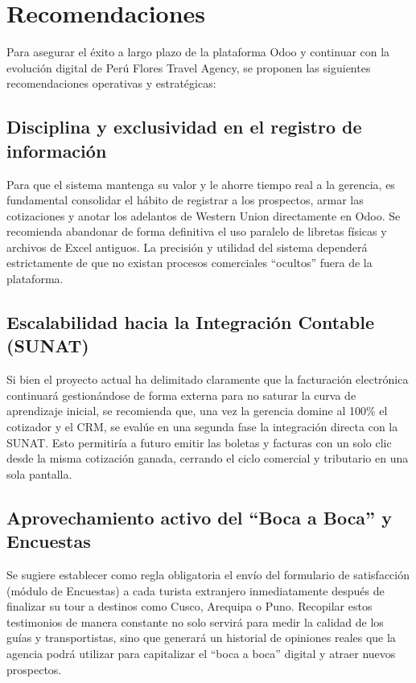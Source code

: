 \section{Recomendaciones}
\begin{indentedsubsection}
Para asegurar el éxito a largo plazo de la plataforma Odoo y continuar con la evolución digital de Perú Flores Travel Agency, se proponen las siguientes recomendaciones operativas y estratégicas:
\end{indentedsubsection}

\subsection{Disciplina y exclusividad en el registro de información}
\begin{indentedsubsection}
Para que el sistema mantenga su valor y le ahorre tiempo real a la gerencia, es fundamental consolidar el hábito de registrar a los prospectos, armar las cotizaciones y anotar los adelantos de Western Union directamente en Odoo. Se recomienda abandonar de forma definitiva el uso paralelo de libretas físicas y archivos de Excel antiguos. La precisión y utilidad del sistema dependerá estrictamente de que no existan procesos comerciales ``ocultos'' fuera de la plataforma.
\end{indentedsubsection}

\subsection{Escalabilidad hacia la Integración Contable (SUNAT)}
\begin{indentedsubsection}
Si bien el proyecto actual ha delimitado claramente que la facturación electrónica continuará gestionándose de forma externa para no saturar la curva de aprendizaje inicial, se recomienda que, una vez la gerencia domine al 100\% el cotizador y el CRM, se evalúe en una segunda fase la integración directa con la SUNAT. Esto permitiría a futuro emitir las boletas y facturas con un solo clic desde la misma cotización ganada, cerrando el ciclo comercial y tributario en una sola pantalla.
\end{indentedsubsection}

\subsection{Aprovechamiento activo del ``Boca a Boca'' y Encuestas}
\begin{indentedsubsection}
Se sugiere establecer como regla obligatoria el envío del formulario de satisfacción (módulo de Encuestas) a cada turista extranjero inmediatamente después de finalizar su tour a destinos como Cusco, Arequipa o Puno. Recopilar estos testimonios de manera constante no solo servirá para medir la calidad de los guías y transportistas, sino que generará un historial de opiniones reales que la agencia podrá utilizar para capitalizar el ``boca a boca'' digital y atraer nuevos prospectos.
\end{indentedsubsection}

